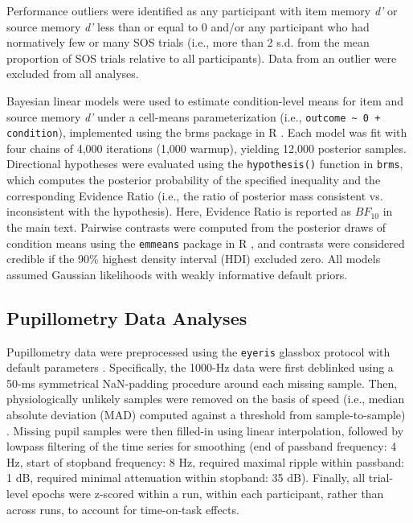Performance outliers were identified as any participant with item memory \textit{d'} or source memory \textit{d'} less than or equal to 0 and/or any participant who had normatively few or many SOS trials (i.e., more than 2 s.d. from the mean proportion of SOS trials relative to all participants). Data from an outlier were excluded from all analyses.

Bayesian linear models were used to estimate condition-level means for item and source memory \textit{d'} under a cell-means parameterization (i.e., \texttt{outcome \textasciitilde{} 0 + condition}), implemented using the brms package in R \parencite{burkner2017brms}. Each model was fit with four chains of 4,000 iterations (1,000 warmup), yielding 12,000 posterior samples. Directional hypotheses were evaluated using the \texttt{hypothesis()} function in \texttt{brms}, which computes the posterior probability of the specified inequality and the corresponding Evidence Ratio (i.e., the ratio of posterior mass consistent vs. inconsistent with the hypothesis). Here, Evidence Ratio is reported as $BF_{10}$ in the main text. Pairwise contrasts were computed from the posterior draws of condition means using the \texttt{emmeans} package in R \parencite{lenth2019emmeans}, and contrasts were considered credible if the 90\% highest density interval (HDI) excluded zero. All models assumed Gaussian likelihoods with weakly informative default priors.

\subsection{Pupillometry Data Analyses}

Pupillometry data were preprocessed using the \texttt{eyeris} glassbox protocol with default parameters \parencite{schwartz2025eyeris,schwartz2025eyerispaper}. Specifically, the 1000-Hz data were first deblinked using a 50-ms symmetrical NaN-padding procedure around each missing sample. Then, physiologically unlikely samples were removed on the basis of speed (i.e., median absolute deviation (MAD) computed against a threshold from sample-to-sample) \parencite{leys2013detecting}. Missing pupil samples were then filled-in using linear interpolation, followed by lowpass filtering of the time series for smoothing (end of passband frequency: 4 Hz, start of stopband frequency: 8 Hz, required maximal ripple within passband: 1 dB, required minimal attenuation within stopband: 35 dB). Finally, all trial-level epochs were z-scored within a run, within each participant, rather than across runs, to account for time-on-task effects.

